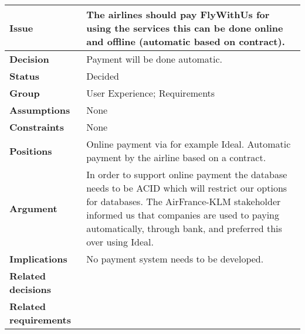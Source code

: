 
\begin{tabular}{ l  p{10cm}}
\hline
\bf Issue & The airlines should pay FlyWithUs for using the services this can be done online and offline (automatic based on contract).\\
\hline
\bf Decision & Payment will be done automatic.\\
\hline
\bf Status & Decided\\
\hline
\bf Group & User Experience;  Requirements \\
\hline
\bf Assumptions & None\\
\hline
\bf Constraints & None \\
\hline
\bf Positions & Online payment via for example Ideal. \newline\newline
Automatic payment by the airline based on a contract.
 \\
\hline
\bf Argument & In order to support online payment the database needs to be ACID which will restrict our options for databases. The AirFrance-KLM stakeholder informed us that companies are used to paying automatically, through bank, and preferred this over using Ideal. \\
\hline
\bf Implications & No payment system needs to be developed. \\
\hline
\bf Related decisions & \\
\hline
\bf Related requirements  & \\
\hline
\end{tabular}
